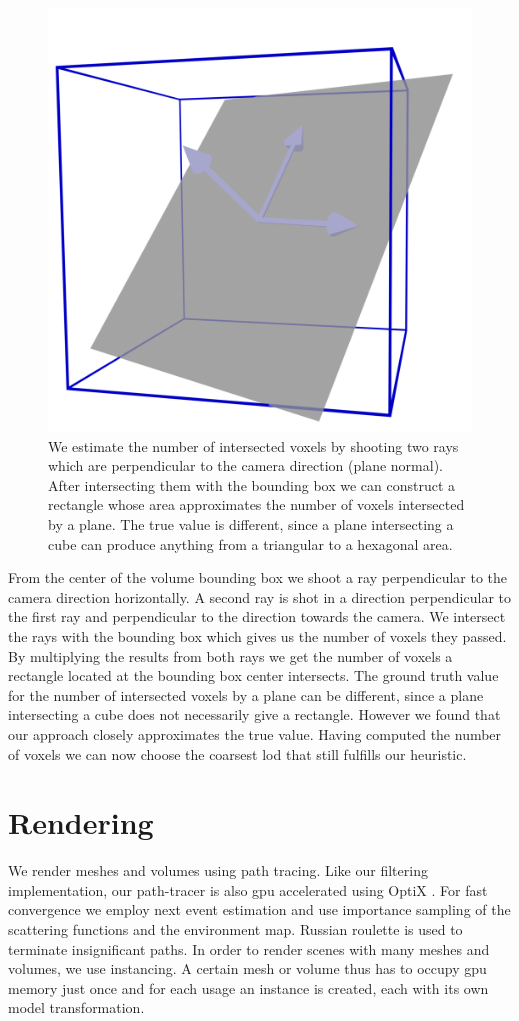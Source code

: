 \begin{figure}[ht]
    \centering
    \includegraphics[width=0.3\linewidth]{img/voxel_estimation.png}
    \caption{We estimate the number of intersected voxels by shooting two rays which are perpendicular to the camera direction (plane normal). After intersecting them with the bounding box we can construct a rectangle whose area approximates the number of voxels intersected by a plane. The true value is different, since a plane intersecting a cube can produce anything from a triangular to a hexagonal area.}
    \label{fig:voxel_estimation}
\end{figure}
From the center of the volume bounding box we shoot a ray perpendicular to the camera direction horizontally.
A second ray is shot in a direction perpendicular to the first ray and perpendicular to the direction towards the camera.
We intersect the rays with the bounding box which gives us the number of voxels they passed.
By multiplying the results from both rays we get the number of voxels a rectangle located at the bounding box center intersects.
The ground truth value for the number of intersected voxels by a plane can be different, since a plane intersecting a cube does not necessarily give a rectangle.
However we found that our approach closely approximates the true value.
Having computed the number of voxels we can now choose the coarsest \ac{lod} that still fulfills our heuristic.



\section{Rendering}
\label{sec:rendering}
We render meshes and volumes using path tracing.
Like our filtering implementation, our path-tracer is also \ac{gpu} accelerated using OptiX \cite{parker_optix}.
For fast convergence we employ next event estimation and use importance sampling of the scattering functions and the environment map.
Russian roulette is used to terminate insignificant paths.
In order to render scenes with many meshes and volumes, we use instancing.
A certain mesh or volume thus has to occupy \ac{gpu} memory just once and for each usage an instance is created, each with its own model transformation.

